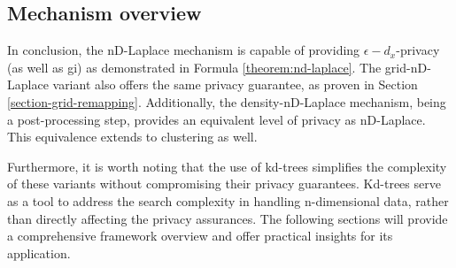 \subsection{Mechanism overview}
In conclusion, the nD-Laplace mechanism is capable of providing $\epsilon-d_x$-privacy (as well as \gls{gi}) as demonstrated in Formula \ref{theorem:nd-laplace}. The grid-nD-Laplace variant also offers the same privacy guarantee, as proven in Section \ref{section-grid-remapping}. Additionally, the density-nD-Laplace mechanism, being a post-processing step, provides an equivalent level of privacy as nD-Laplace. This equivalence extends to clustering as well.

Furthermore, it is worth noting that the use of kd-trees simplifies the complexity of these variants without compromising their privacy guarantees. Kd-trees serve as a tool to address the search complexity in handling n-dimensional data, rather than directly affecting the privacy assurances.
The following sections will provide a comprehensive framework overview and offer practical insights for its application.

